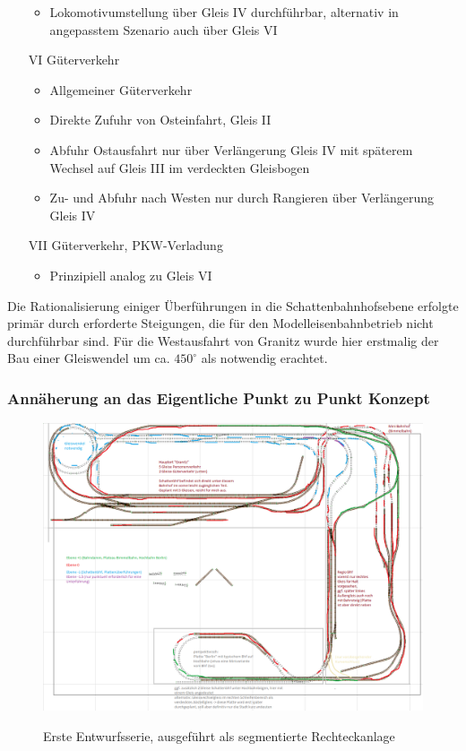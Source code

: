 \begin{itemize}
\begin{itemize}
		\item Lokomotivumstellung \"uber Gleis IV durchf\"uhrbar, alternativ in angepasstem Szenario auch \"uber Gleis VI
	\end{itemize}
	\item[VI] G\"uterverkehr
	\begin{itemize}
		\item Allgemeiner G\"uterverkehr
		\item Direkte Zufuhr von Osteinfahrt, Gleis II
		\item Abfuhr Ostausfahrt nur \"uber Verl\"angerung Gleis IV mit sp\"aterem Wechsel auf Gleis III im verdeckten Gleisbogen
		\item Zu- und Abfuhr nach Westen nur durch Rangieren \"uber Verl\"angerung Gleis IV
	\end{itemize}
	\item[VII] G\"uterverkehr, PKW-Verladung
	\begin{itemize}
		\item Prinzipiell analog zu Gleis VI
	\end{itemize}
\end{itemize}
	
Die Rationalisierung einiger \"Uberf\"uhrungen in die Schattenbahnhofsebene erfolgte prim\"ar durch erforderte Steigungen, die f\"ur den Modelleisenbahnbetrieb nicht durchf\"uhrbar sind.
F\"ur die Westausfahrt von Granitz wurde hier erstmalig der Bau einer Gleiswendel um ca. $450^{\circ}$ als notwendig erachtet.



\subsubsection{Ann\"aherung an das Eigentliche Punkt zu Punkt Konzept}


\begin{figure}[h]
\centering
  \includegraphics[width=1.0\textwidth]{img/map_evolution/state3_granitz_modules.png}
	\label{img:state3_granitz_modules}
	\caption{Erste Entwurfsserie, ausgef\"uhrt als segmentierte Rechteckanlage}
\end{figure}


